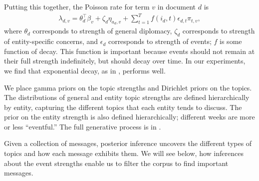 Putting this together, the Poisson rate for term $v$ in document $d$ is
\begin{align}
  \lambda_{d,v} = \theta_d^\top\beta_v  + \zeta_d \eta_{a_d,v} + \sum_{t=1}^T f(i_d, t) \epsilon_{d,t} \pi_{t,v},
\label{eq:poisrate}
\end{align} where $\theta_d$ corresponds to strength of general diplomacy, $\zeta_d$ corresponds to strength of entity-specific concerns, and $\epsilon_d$ corresponds to strength of events; $f$ is some function of decay.  This function is important because events should not remain at their full strength indefinitely, but should decay over time.  In our experiments, we find that exponential decay, as in , performs well.

We place gamma priors on the topic strengths and Dirichlet priors on
the topics. The distributions of general and entity topic strengths are defined
hierarchically by entity, capturing the different topics that each
entity tends to discuss.  The prior on the entity strength is
also defined hierarchically; different weeks are more or less
``eventful.'' The full generative process is in .

Given a collection of messages, posterior inference uncovers the
different types of topics and how each message exhibits them. We will
see below, how inferences about the event strengths enable us to
filter the corpus to find important messages.




